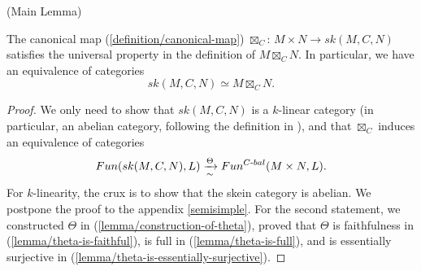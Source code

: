 \begin{lemma} (Main Lemma) \label{lemma/main-lemma}

  \noindent The canonical map (\ref{definition/canonical-map})
  $\boxtimes_{C}$: $M \times N \to sk(M,C,N)$ satisfies the universal property
  in the definition of $M \boxtimes_{C} N$. In particular, we have an
  equivalence of categories
  \[
    sk(M,C,N) \simeq M \boxtimes_{C} N.
  \]
\end{lemma}

\begin{proof}
  We only need to show that $sk(M,C,N)$ is a $k$-linear category (in
  particular, an abelian category, following the definition in
  \cite{douglas/balanced-product}), and that $\boxtimes_{C}$ induces an equivalence of
  categories
  \[
    Fun(sk(M,C,N), L) \xrightarrow[\sim]{\Theta} Fun^{C{\text -}bal}(M \times N, L).
  \]
  For $k$-linearity, the crux is to show that the skein category is abelian.
  We postpone the proof to the appendix \ref{semisimple}. For the second
  statement, we constructed $\Theta$ in (\ref{lemma/construction-of-theta}), proved that $\Theta$ is faithfulness in
  (\ref{lemma/theta-is-faithful}), is full in (\ref{lemma/theta-is-full}), and is essentially surjective in (\ref{lemma/theta-is-essentially-surjective}).
\end{proof}


